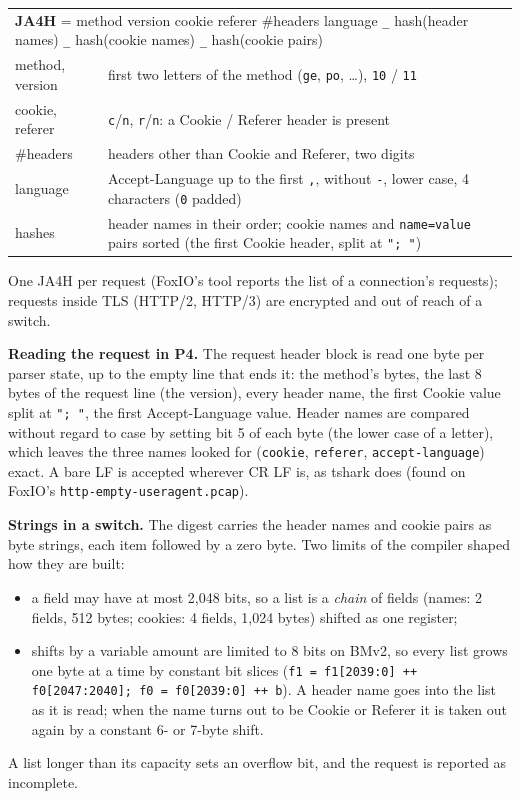 \documentclass[11pt,a4paper]{article}
\newcommand{\code}[1]{\texttt{#1}}
\begin{document}
\begin{tabularx}{\textwidth}{l X}
\toprule
\multicolumn{2}{l}{\textbf{JA4H} = method version cookie referer \#headers language \code{\_} hash(header names) \code{\_} hash(cookie names) \code{\_} hash(cookie pairs)} \\
method, version & first two letters of the method (\code{ge}, \code{po}, \ldots), \code{10} / \code{11} \\
cookie, referer & \code{c}/\code{n}, \code{r}/\code{n}: a Cookie / Referer header is present \\
\#headers & headers other than Cookie and Referer, two digits \\
language & Accept-Language up to the first \code{,}, without \code{-}, lower case, 4 characters (\code{0} padded) \\
hashes & header names in their order; cookie names and \code{name=value} pairs sorted (the first Cookie header, split at \code{"; "}) \\
\bottomrule
\end{tabularx}

One JA4H per request (FoxIO's tool reports the list of a connection's requests); requests inside TLS (HTTP/2,
HTTP/3) are encrypted and out of reach of a switch.

\textbf{Reading the request in P4.} The request header block is read one byte per parser state, up to the empty line
that ends it: the method's bytes, the last 8 bytes of the request line (the version), every header name, the first
Cookie value split at \code{"; "}, the first Accept-Language value. Header names are compared without regard to case
by setting bit 5 of each byte (the lower case of a letter), which leaves the three names looked for
(\code{cookie}, \code{referer}, \code{accept-language}) exact. A bare LF is accepted wherever CR LF is, as tshark does
(found on FoxIO's \code{http-empty-useragent.pcap}).

\textbf{Strings in a switch.} The digest carries the header names and cookie pairs as byte strings, each item
followed by a zero byte. Two limits of the compiler shaped how they are built:
\begin{itemize}
\item a field may have at most 2,048 bits, so a list is a \emph{chain} of fields (names: 2 fields, 512 bytes;
  cookies: 4 fields, 1,024 bytes) shifted as one register;
\item shifts by a variable amount are limited to 8 bits on BMv2, so every list grows one byte at a time by constant
  bit slices (\code{f1 = f1[2039:0] ++ f0[2047:2040]; f0 = f0[2039:0] ++ b}). A header name goes into the list as
  it is read; when the name turns out to be Cookie or Referer it is taken out again by a constant 6- or 7-byte shift.
\end{itemize}
A list longer than its capacity sets an overflow bit, and the request is reported as incomplete.
\end{document}
